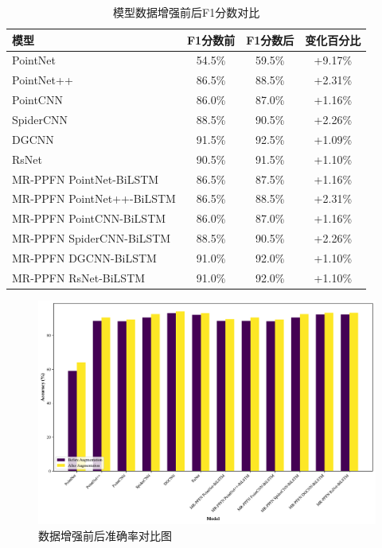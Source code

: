 \begin{table}[htbp]
    \begin{subtable}{\linewidth}
        \centering
        \caption{模型数据增强前后F1分数对比}
        \begin{tabular}{lccc}
            \toprule
            \textbf{模型} & \textbf{F1分数前} & \textbf{F1分数后} & \textbf{变化百分比} \\
            \midrule
            PointNet & 54.5\% & 59.5\% & +9.17\% \\
            PointNet++ & 86.5\% & 88.5\% & +2.31\% \\
            PointCNN & 86.0\% & 87.0\% & +1.16\% \\
            SpiderCNN & 88.5\% & 90.5\% & +2.26\% \\
            DGCNN & 91.5\% & 92.5\% & +1.09\% \\
            RsNet & 90.5\% & 91.5\% & +1.10\% \\
            MR-PPFN PointNet-BiLSTM & 86.5\% & 87.5\% & +1.16\% \\
            MR-PPFN PointNet++-BiLSTM & 86.5\% & 88.5\% & +2.31\% \\
            MR-PPFN PointCNN-BiLSTM & 86.0\% & 87.0\% & +1.16\% \\
            MR-PPFN SpiderCNN-BiLSTM & 88.5\% & 90.5\% & +2.26\% \\
            MR-PPFN DGCNN-BiLSTM & 91.0\% & 92.0\% & +1.10\% \\
            MR-PPFN RsNet-BiLSTM & 91.0\% & 92.0\% & +1.10\% \\
            \bottomrule
        \end{tabular}
        \label{tab:f1-comparison}
    \end{subtable}
\end{table}
 

\begin{figure}[htbp]
    \centering
    \includegraphics[width=1\linewidth]{imgs/data_augment_accuracy_comparison.pdf}
    \caption{数据增强前后准确率对比图}
    \label{fig:data_augment_accuracy_comparison}
\end{figure}

